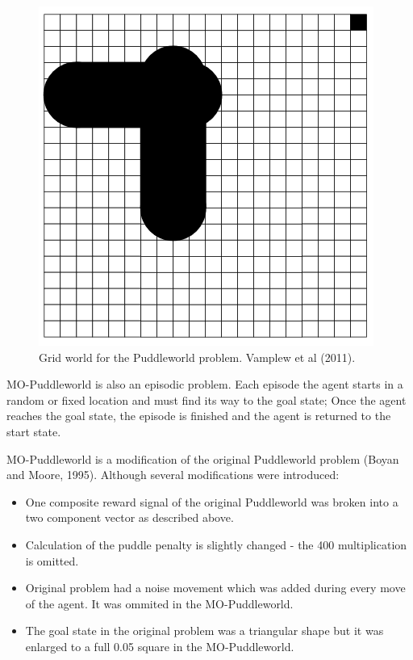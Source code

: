 \begin{figure}[ht]
\vskip 0.2in
\centering
\includegraphics[scale=0.9]{pw.png}
\caption{Grid world for the Puddleworld problem. Vamplew et al (2011).}
\label{fig:PWOverview}
\end{figure}

MO-Puddleworld is also an episodic problem. Each episode the agent starts in a random or fixed location and must find its way to the goal state; Once the agent reaches the goal state, the episode is finished and the agent is returned to the start state.

MO-Puddleworld is a modification of the original Puddleworld problem (Boyan and Moore, 1995\nocite{boyan1995generalization}). Although several modifications were introduced:

\begin{itemize}
  \item One composite reward signal of the original Puddleworld was broken into a two component vector as described above.
  \item Calculation of the puddle penalty is slightly changed - the 400 multiplication is omitted.
  \item Original problem had a noise movement which was added during every move of the agent. It was ommited in the MO-Puddleworld.
  \item The goal state in the original problem was a triangular shape but it was enlarged to a full 0.05 square in the MO-Puddleworld.
\end{itemize}

